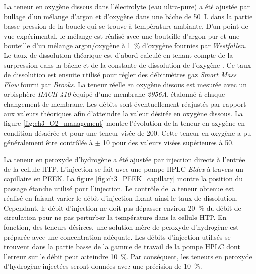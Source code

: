 \begin{refsection}
    La teneur en oxygène dissous dans l'électrolyte (eau ultra-pure) a été ajustée par bullage d'un mélange d'argon et
    d'oxygène dans une bâche de \SI{50}{\liter} dans la partie basse pression de la boucle qui se trouve à
    température ambiante. D'un point de vue expérimental, le mélange est réalisé avec une
    bouteille d'argon pur et une bouteille d'un mélange argon/oxygène à \SI{1}{\percent} d'oxygène fournies par
    \emph{Westfallen}. Le taux de dissolution théorique est d'abord calculé en tenant compte de la surpression dans la bâche et
    de la constante de dissolution de l'oxygène \citep{Tromans1998}. Ce taux de dissolution est ensuite utilisé pour
    régler des débitmètres gaz \emph{Smart Mass Flow} fourni par \emph{Brooks}. La teneur réelle en oxygène dissous est mesurée avec un
    orbisphère \emph{HACH 410} équipé d'une membrane \emph{2956A}, étalonné à chaque changement de membrane. Les
    débits sont éventuellement réajustés par rapport aux valeurs théoriques afin d'atteindre la valeur désirée en
    oxygène dissous. La figure \ref{fig:ch3_O2_management} montre l'évolution de la teneur en oxygène en condition
    désaérée et pour une teneur visée de \SI{200}{\ppb}.
    Cette teneur en oxygène a pu généralement être contrôlée à $\pm$ \SI{10}{\ppb} pour des valeurs visées supérieures à
    \SI{50}{\ppb}. 

    La teneur en peroxyde d'hydrogène a été ajustée par injection directe à l'entrée de la cellule HTP.
    L'injection se fait avec une pompe HPLC \emph{Eldex} à travers un capillaire en PEEK. La figure
    \ref{fig:ch3_PEEK_capillary} montre la position du passage étanche utilisé pour l'injection. Le contrôle de la
    teneur obtenue est réalisé en faisant varier le débit d'injection fixant ainsi le taux de dissolution. Cependant, le
    débit d'injection ne doit pas dépasser environ \SI{20}{\percent} du débit de circulation pour ne pas perturber
    la température dans la cellule HTP. En fonction, des teneurs désirées, une solution mère de peroxyde
    d'hydrogène est préparée avec une concentration adéquate. Les débits d'injection utilisés se trouvent dans la
    partie basse de la gamme de travail de la pompe HPLC dont l'erreur sur le débit peut atteindre \SI{10}{\percent}.
    Par conséquent, les teneurs en peroxyde d'hydrogène injectées seront données avec une précision de \SI{10}{\percent}.


\end{refsection}
